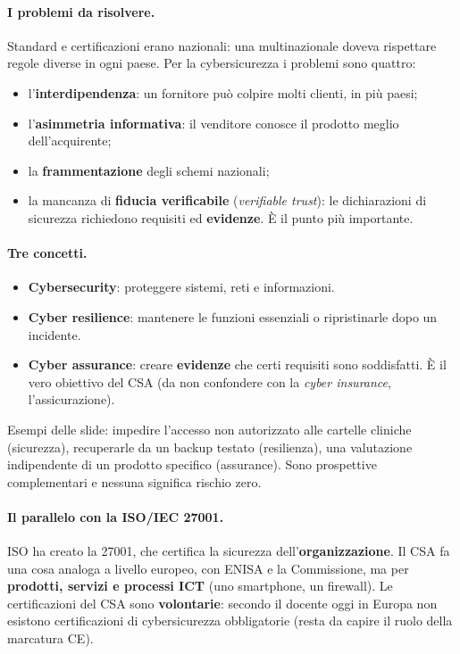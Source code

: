 \paragraph{I problemi da risolvere.} Standard e certificazioni erano nazionali: una multinazionale doveva
rispettare regole diverse in ogni paese. Per la cybersicurezza i problemi sono quattro:
\begin{itemize}
  \item l'\textbf{interdipendenza}: un fornitore può colpire molti clienti, in più paesi;
  \item l'\textbf{asimmetria informativa}: il venditore conosce il prodotto meglio dell'acquirente;
  \item la \textbf{frammentazione} degli schemi nazionali;
  \item la mancanza di \textbf{fiducia verificabile} (\emph{verifiable trust}): le dichiarazioni di
    sicurezza richiedono requisiti ed \textbf{evidenze}. È il punto più importante.
\end{itemize}

\paragraph{Tre concetti.}
\begin{itemize}
  \item \textbf{Cybersecurity}: proteggere sistemi, reti e informazioni.
  \item \textbf{Cyber resilience}: mantenere le funzioni essenziali o ripristinarle dopo un incidente.
  \item \textbf{Cyber assurance}: creare \textbf{evidenze} che certi requisiti sono soddisfatti. È il
    vero obiettivo del CSA (da non confondere con la \emph{cyber insurance}, l'assicurazione).
\end{itemize}
Esempi delle slide: impedire l'accesso non autorizzato alle cartelle cliniche (sicurezza), recuperarle da
un backup testato (resilienza), una valutazione indipendente di un prodotto specifico (assurance). Sono
prospettive complementari e nessuna significa rischio zero.

\paragraph{Il parallelo con la ISO/IEC 27001.} ISO ha creato la 27001, che certifica la sicurezza
dell'\textbf{organizzazione}. Il CSA fa una cosa analoga a livello europeo, con ENISA e la Commissione,
ma per \textbf{prodotti, servizi e processi ICT} (uno smartphone, un firewall). Le certificazioni del CSA
sono \textbf{volontarie}: secondo il docente oggi in Europa non esistono certificazioni di cybersicurezza
obbligatorie (resta da capire il ruolo della marcatura CE).

